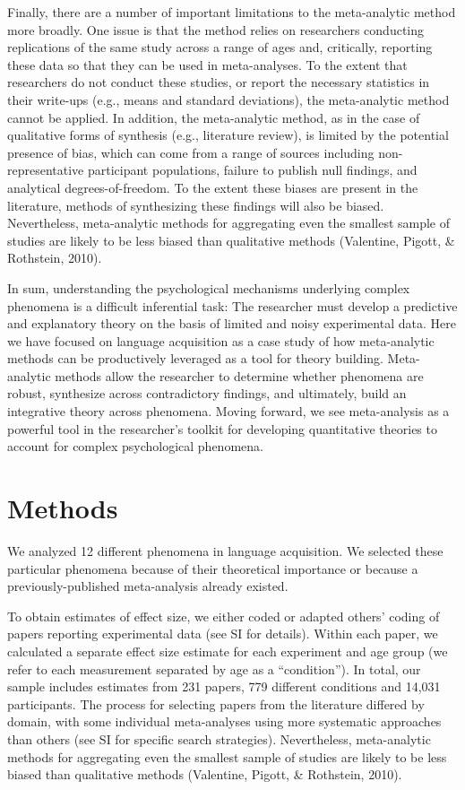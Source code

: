\documentclass[english,floatsintext,man]{apa6}
\theoremstyle{definition}
\theoremstyle{definition}
\theoremstyle{remark}
\begin{document}
Finally, there are a number of important limitations to the
meta-analytic method more broadly. One issue is that the method relies
on researchers conducting replications of the same study across a range
of ages and, critically, reporting these data so that they can be used
in meta-analyses. To the extent that researchers do not conduct these
studies, or report the necessary statistics in their write-ups (e.g.,
means and standard deviations), the meta-analytic method cannot be
applied. In addition, the meta-analytic method, as in the case of
qualitative forms of synthesis (e.g., literature review), is limited by
the potential presence of bias, which can come from a range of sources
including non-representative participant populations, failure to publish
null findings, and analytical degrees-of-freedom. To the extent these
biases are present in the literature, methods of synthesizing these
findings will also be biased. Nevertheless, meta-analytic methods for
aggregating even the smallest sample of studies are likely to be less
biased than qualitative methods (Valentine, Pigott, \& Rothstein, 2010).

In sum, understanding the psychological mechanisms underlying complex
phenomena is a difficult inferential task: The researcher must develop a
predictive and explanatory theory on the basis of limited and noisy
experimental data. Here we have focused on language acquisition as a
case study of how meta-analytic methods can be productively leveraged as
a tool for theory building. Meta-analytic methods allow the researcher
to determine whether phenomena are robust, synthesize across
contradictory findings, and ultimately, build an integrative theory
across phenomena. Moving forward, we see meta-analysis as a powerful
tool in the researcher's toolkit for developing quantitative theories to
account for complex psychological phenomena.

\section{Methods}\label{methods}

We analyzed 12 different phenomena in language acquisition. We selected
these particular phenomena because of their theoretical importance or
because a previously-published meta-analysis already existed.

To obtain estimates of effect size, we either coded or adapted others'
coding of papers reporting experimental data (see SI for details).
Within each paper, we calculated a separate effect size estimate for
each experiment and age group (we refer to each measurement separated by
age as a \enquote{condition}). In total, our sample includes estimates
from 231 papers, 779 different conditions and 14,031 participants. The
process for selecting papers from the literature differed by domain,
with some individual meta-analyses using more systematic approaches than
others (see SI for specific search strategies). Nevertheless,
meta-analytic methods for aggregating even the smallest sample of
studies are likely to be less biased than qualitative methods
(Valentine, Pigott, \& Rothstein, 2010).
\end{document}
